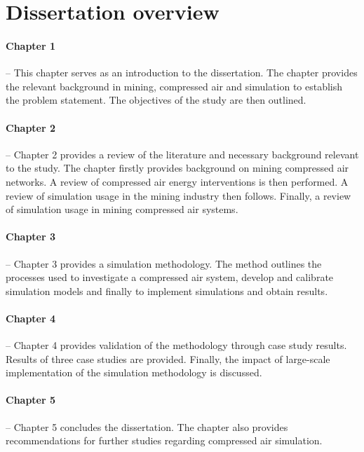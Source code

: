 \section{Dissertation overview}
	\paragraph{Chapter 1} \hspace{0.4cm} -- \hspace{0.05cm} This chapter serves as an introduction to the dissertation. The chapter provides the relevant background in mining, compressed air and simulation to establish the problem statement. The objectives of the study are then outlined.
	\paragraph{Chapter 2} \hspace{0.4cm} -- \hspace{0.05cm} Chapter 2 provides a review of the literature and necessary background relevant to the study. The chapter firstly provides background on mining compressed air networks. A review of compressed air energy interventions is then performed. A review of simulation usage in the mining industry then follows. Finally, a review of simulation usage in mining compressed air systems.
	\paragraph{Chapter 3} \hspace{0.4cm} -- \hspace{0.05cm} Chapter 3 provides a simulation methodology. The method outlines the processes used to investigate a compressed air system, develop and calibrate simulation models and finally to implement simulations and obtain results.
	\paragraph{Chapter 4} \hspace{0.4cm} -- \hspace{0.05cm} Chapter 4 provides validation of the methodology through case study results. Results of three case studies are provided. Finally, the impact of large-scale implementation of the simulation methodology is discussed.
	\paragraph{Chapter 5} \hspace{0.4cm} -- \hspace{0.05cm} Chapter 5 concludes the dissertation. The chapter also provides recommendations for further studies regarding compressed air simulation.
